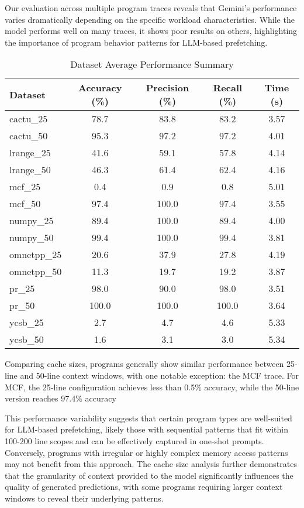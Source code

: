 \documentclass[sigconf,authorversion,nonacm]{acmart}
\begin{document}
Our evaluation across multiple program traces reveals that Gemini's performance varies dramatically depending on the specific workload characteristics. While the model performs well on many traces, it shows poor results on others, highlighting the importance of program behavior patterns for LLM-based prefetching.

\begin{table}[!htbp]
\centering
\caption{Dataset Average Performance Summary}
\label{tab:dataset-summary}
\small
\begin{tabular}{@{}lcccc@{}}
\toprule
\textbf{Dataset} & \textbf{Accuracy (\%)} & \textbf{Precision (\%)} & \textbf{Recall (\%)} & \textbf{Time (s)}\\
\midrule
cactu\_25 & 78.7 & 83.8 & 83.2 & 3.57 \\
cactu\_50 & 95.3 & 97.2 & 97.2 & 4.01 \\
\midrule
lrange\_25 & 41.6 & 59.1 & 57.8 & 4.14 \\
lrange\_50 & 46.3 & 61.4 & 62.4 & 4.16 \\
\midrule
mcf\_25 & 0.4 & 0.9 & 0.8 & 5.01 \\
mcf\_50 & 97.4 & 100.0 & 97.4 & 3.55 \\
\midrule
numpy\_25 & 89.4 & 100.0 & 89.4 & 4.00 \\
numpy\_50 & 99.4 & 100.0 & 99.4 & 3.81 \\
\midrule
omnetpp\_25 & 20.6 & 37.9 & 27.8 & 4.19 \\
omnetpp\_50 & 11.3 & 19.7 & 19.2 & 3.87 \\
\midrule
pr\_25 & 98.0 & 90.0 & 98.0 & 3.51 \\
pr\_50 & 100.0 & 100.0 & 100.0 & 3.64 \\
\midrule
ycsb\_25 & 2.7 & 4.7 & 4.6 & 5.33 \\
ycsb\_50 & 1.6 & 3.1 & 3.0 & 5.34 \\
\bottomrule
\end{tabular}
\end{table}

Comparing cache sizes, programs generally show similar performance between 25-line and 50-line context windows, with one notable exception: the MCF trace. For MCF, the 25-line configuration achieves less than 0.5\% accuracy, while the 50-line version reaches 97.4\% accuracy

This performance variability suggests that certain program types are well-suited for LLM-based prefetching, likely those with sequential patterns that fit within 100-200 line scopes and can be effectively captured in one-shot prompts. Conversely, programs with irregular or highly complex memory access patterns may not benefit from this approach. The cache size analysis further demonstrates that the granularity of context provided to the model significantly influences the quality of generated predictions, with some programs requiring larger context windows to reveal their underlying patterns.
\end{document}
